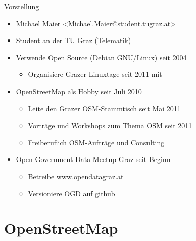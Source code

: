 \documentclass{beamer}
\begin{document}
\begin{frame}{Vorstellung}

  \begin{itemize}
    \item Michael Maier \textless \href{mailto:Michael.Maier@student.tugraz.at}{Michael.Maier@student.tugraz.at}\textgreater
    \item Student an der TU Graz (Telematik)
    \item Verwende Open Source (Debian GNU/Linux) seit 2004
    \begin{itemize}
        \item Organisiere Grazer Linuxtage seit 2011 mit
    \end{itemize}

\vspace{0.15cm}
    \item OpenStreetMap als Hobby seit Juli 2010
    \begin{itemize}
        \item Leite den Grazer OSM-Stammtisch seit Mai 2011
        \item Vorträge und Workshops zum Thema OSM seit 2011
        \item Freiberuflich OSM-Aufträge und Consulting
    \end{itemize}
\vspace{0.3cm}
    \item Open Government Data Meetup Graz seit Beginn
    \begin{itemize}
        \item Betreibe \href{http://opendatagraz.at}{www.opendatagraz.at}
        \item Versioniere OGD auf github
    \end{itemize}
  \end{itemize}
\end{frame}




\section{OpenStreetMap}
\end{document}

